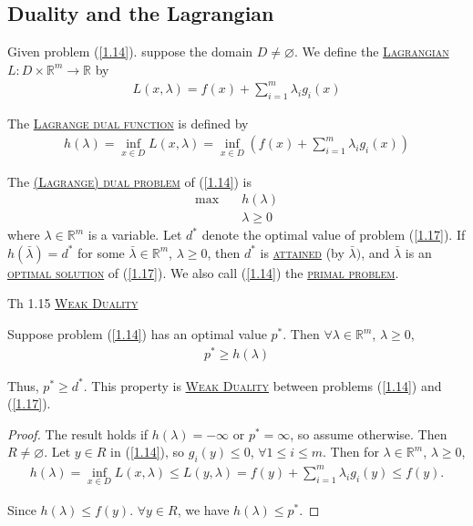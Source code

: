 \subsection{Duality and the Lagrangian}
Given problem (\ref{1.14}). suppose the domain $D\neq \varnothing$. We define the  \underline{\textcolor{MarkerColour}{\textsc{Lagrangian}}} $L: D\times\mathbb{R}^m \to \mathbb{R}$ by
\begin{align*}
    L(x, \lambda) = f(x) + \sum\limits_{i=1}^m \lambda_i g_i(x)
\end{align*}

\begin{definition}
    The \underline{\textcolor{MarkerColour}{\textsc{Lagrange dual function}}} is defined by
    \begin{align}
        h(\lambda) = \inf\limits_{x\in D} L(x, \lambda) = \inf\limits_{x\in D} \left(f(x) + \sum\limits_{i=1}^m \lambda_i g_i(x) \right) \nonumber
    \end{align}

    The \underline{\textcolor{MarkerColour}{\textsc{(Lagrange) dual problem}}} of (\ref{1.14}) is 
    \begin{align}
        \max\quad & h(\lambda)\nonumber \\
        & \lambda \ge 0\label{1.17}
    \end{align}
    where $\lambda\in\mathbb{R}^m$ is a variable. Let $d^*$ denote the optimal value of problem (\ref{1.17}). If $h(\bar{\lambda}) = d^*$ for some $\bar{\lambda}\in\mathbb{R}^m$, $\lambda\ge 0$, then $d^*$ is  \underline{\textcolor{MarkerColour}{\textsc{attained}}} (by $\bar{\lambda})$, and $\bar{\lambda}$ is an \underline{\textcolor{MarkerColour}{\textsc{optimal solution}}} of (\ref{1.17}). We also call (\ref{1.14}) the \underline{\textcolor{MarkerColour}{\textsc{primal problem}}}.
\end{definition}

\begin{theorem}
    Th 1.15 \underline{\textcolor{MarkerColour}{\textsc{Weak Duality}}}
    \par Suppose problem (\ref{1.14}) has an optimal value $p^*$. Then $\forall \lambda\in\mathbb{R}^m$, $\lambda\ge 0$, 
    \begin{align*}
        p^* \ge h(\lambda)
    \end{align*}

    Thus, $p^*\ge d^*$. This property is \underline{\textcolor{MarkerColour}{\textsc{Weak Duality}}} between problems (\ref{1.14}) and (\ref{1.17}). 
\end{theorem}
\begin{proof}
    The result holds if $h(\lambda) = -\infty$ or $p^* = \infty$, so assume otherwise. Then $R\neq\varnothing$. Let $y\in R$ in (\ref{1.14}), so $g_i(y)\le 0$, $\forall 1\le i\le m$. Then for $\lambda\in\mathbb{R}^m$, $\lambda\ge 0$,
    \begin{align*}
        h(\lambda) = \inf\limits_{x\in D} L(x, \lambda) \le L(y, \lambda) = f(y) + \sum\limits_{i=1}^m \lambda_i g_i(y) \le f(y).
    \end{align*}

    Since $h(\lambda) \le f(y)$. $\forall y\in R$, we have $h(\lambda) \le p^*$.
\end{proof}


